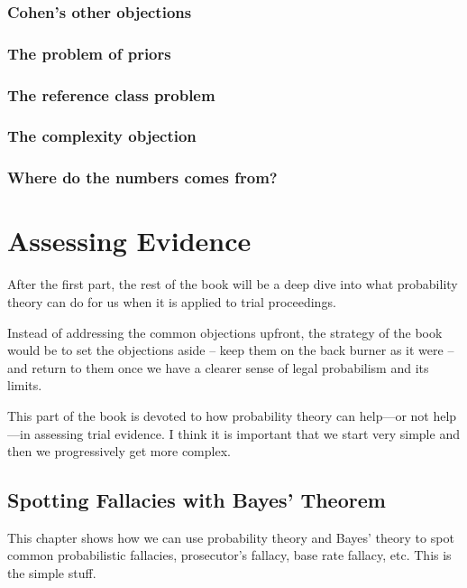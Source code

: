 \documentclass[]{book}
\begin{document}
\section{Cohen's other objections}

\section{The problem of priors}

\section{The reference class problem}

\section{The complexity objection}

\section{Where do the numbers comes from?}

\part{Assessing Evidence}

After the first part, the rest of the book will be a deep dive into what
probability theory can do for us when it is applied to trial
proceedings.

Instead of addressing the common objections upfront, the strategy of the
book would be to set the objections aside -- keep them on the back
burner as it were -- and return to them once we have a clearer sense of
legal probabilism and its limits.


This part of the book is devoted to how probability theory can help---or
not help---in assessing trial evidence. I think it is important that we
start very simple and then we progressively get more complex.

\chapter{Spotting Fallacies with Bayes' Theorem}

This chapter shows how we can use probability theory and Bayes' theory
to spot common probabilistic fallacies, prosecutor's fallacy, base rate
fallacy, etc. This is the simple stuff.
\end{document}
